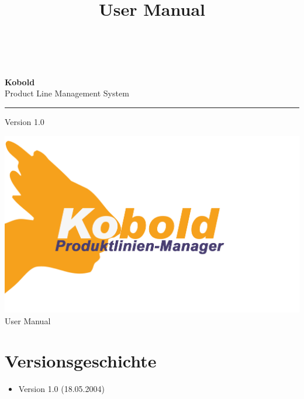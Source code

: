 \documentclass[a4paper,titlepage,12pt]{scrbook}
\title {\huge \product\\[0.5cm]\large User Manual \\[0.5cm] \version
  \\[1cm] \Large \company}
\newcommand\version{Version 1.0\xspace}
\begin{document}

\begin{titlepage}
\renewcommand{\thefootnote}{\fnsymbol{footnote}}
{\Huge
\raggedright
\textbf{\bf Kobold} \\
\huge Product Line Management System
\rule{\textwidth}{0.75pt}
\par
}
\begin{flushleft}
\normalsize
\version
\end{flushleft}


\vfill
\includegraphics[width=15cm]{../common/logo-color.png}
\vfill
{\parindent=0cm
\Huge User Manual
}


\setcounter{footnote}{0}
\end{titlepage}


\section*{Versionsgeschichte}

\begin{itemize}

\item Version 1.0 (18.05.2004)

\end{itemize}

\tableofcontents







\end{document}
